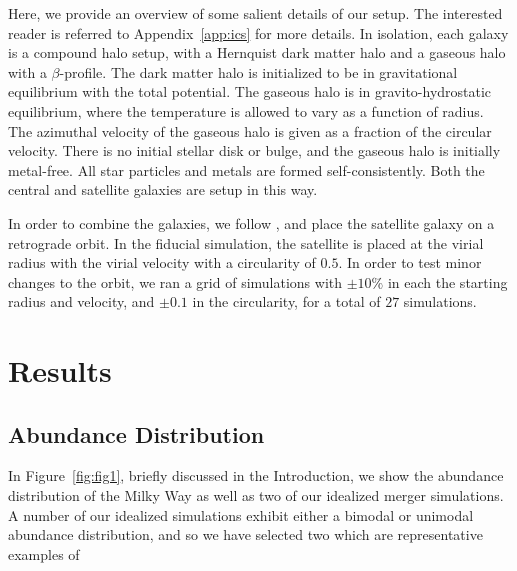 \documentclass[linenumbers, twocolumn]{aastex631}
\begin{document}
Here, we provide an overview of some salient details of our setup. The interested reader is referred to Appendix~\ref{app:ics} for more details. In isolation, each galaxy is a compound halo setup, with a Hernquist dark matter halo and a gaseous halo with a $\beta$-profile. The dark matter halo is initialized to be in gravitational equilibrium with the total potential. The gaseous halo is in gravito-hydrostatic equilibrium, where the temperature is allowed to vary as a function of radius. The azimuthal velocity of the gaseous halo is given as a fraction of the circular velocity. There is no initial stellar disk or bulge, and the gaseous halo is initially metal-free. All star particles and metals are formed self-consistently. Both the central and satellite galaxies are setup in this way.

In order to combine the galaxies, we follow \citet{2021ApJ...923...92N}, and place the satellite galaxy on a retrograde orbit. In the fiducial simulation, the satellite is placed at the virial radius with the virial velocity with a circularity of $0.5$. In order to test minor changes to the orbit, we ran a grid of simulations with $\pm10\%$ in each the starting radius and velocity, and $\pm0.1$ in the circularity, for a total of $27$ simulations.

\section{Results}\label{sec:results}
\subsection{Abundance Distribution}
In Figure~\ref{fig:fig1}, briefly discussed in the Introduction, we show the abundance distribution of the Milky Way as well as two of our idealized merger simulations. A number of our idealized simulations exhibit either a bimodal or unimodal abundance distribution, and so we have selected two which are representative examples of 
\end{document}
